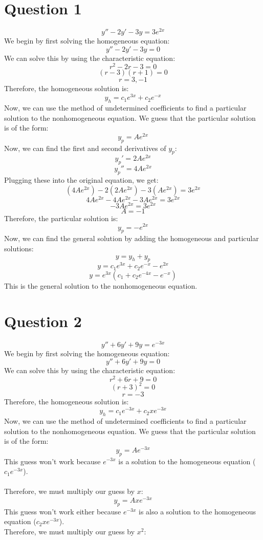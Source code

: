 \documentclass{article}
\begin{document}
\section*{Question 1}
\[
    y'' - 2y' - 3y = 3e^{2x}
\]
We begin by first solving the homogeneous equation:
\[
    y'' - 2y' - 3y = 0
\]
We can solve this by using the characteristic equation:
\[
    r^2 - 2r - 3 = 0
\]
\[
    (r - 3)(r + 1) = 0
\]
\[
    r = 3, -1
\]
Therefore, the homogeneous solution is:
\[
    y_h = c_1e^{3x} + c_2e^{-x}
\]
Now, we can use the method of undetermined coefficients to find a particular solution to the nonhomogeneous equation. We guess that the particular solution is of the form:
\[
    y_p = Ae^{2x}
\]
Now, we can find the first and second derivatives of $y_p$:
\[
    y_p' = 2Ae^{2x}
\]
\[
    y_p'' = 4Ae^{2x}
\]
Plugging these into the original equation, we get:
\[
    (4Ae^{2x}) - 2(2Ae^{2x}) - 3(Ae^{2x}) = 3e^{2x}
\]
\[
    4Ae^{2x} - 4Ae^{2x} - 3Ae^{2x} = 3e^{2x}
\]
\[
    -3Ae^{2x} = 3e^{2x}
\]
\[
    A = -1
\]
Therefore, the particular solution is:
\[
    y_p = -e^{2x}
\]
Now, we can find the general solution by adding the homogeneous and particular solutions:
\[
    y = y_h + y_p
\]
\[
    y = c_1e^{3x} + c_2e^{-x} - e^{2x}
\]
\[
    y = e^{3x}(c_1 + c_2e^{-4x} - e^{-x})
\]
This is the general solution to the nonhomogeneous equation.


\section*{Question 2}
\[
y'' + 6y' + 9y = e^{-3x}
\]
We begin by first solving the homogeneous equation:
\[
y'' + 6y' + 9y = 0
\]
We can solve this by using the characteristic equation:
\[
r^2 + 6r + 9 = 0
\]
\[
(r + 3)^2 = 0
\]
\[
r = -3
\]
Therefore, the homogeneous solution is:
\[
y_h = c_1e^{-3x} + c_2xe^{-3x}
\]
Now, we can use the method of undetermined coefficients to find a particular solution to the nonhomogeneous equation. We guess that the particular solution is of the form:
\[
y_p = Ae^{-3x}
\]
This guess won't work because $e^{-3x}$ is a solution to the homogeneous equation ($c_1e^{-3x}$).
\\
\\Therefore, we must multiply our guess by $x$:
\[
y_p = Axe^{-3x}
\]
This guess won't work either because $e^{-3x}$ is also a solution to the homogeneous equation ($c_2xe^{-3x}$).
\\Therefore, we must multiply our guess by $x^2$:
\end{document}
